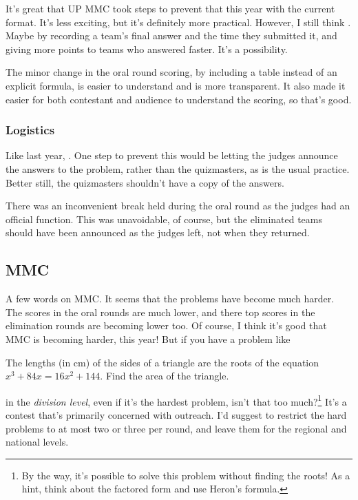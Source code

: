 \documentclass[11pt,paper=letter]{scrartcl}
\begin{document}
It's great that UP MMC took steps to prevent that this year with the current format. It's less exciting, but it's definitely more practical. However, I still think . Maybe by recording a team's final answer and the time they submitted it, and giving more points to teams who answered faster. It's a possibility.

The minor change in the oral round scoring, by including a table instead of an explicit formula, is easier to understand and is more transparent. It also made it easier for both contestant and audience to understand the scoring, so that's good.

\subsubsection*{Logistics}

Like last year, . One step to prevent this would be letting the judges announce the answers to the problem, rather than the quizmasters, as is the usual practice. Better still, the quizmasters shouldn't have a copy of the answers.

There was an inconvenient break held during the oral round as the judges had an official function. This was unavoidable, of course, but the eliminated teams should have been announced as the judges left, not when they returned. 

\subsection{MMC}

A few words on MMC. It seems that the problems have become much harder. The scores in the oral rounds are much lower, and there top scores in the elimination rounds are becoming lower too. Of course, I think it's good that MMC is becoming harder,  this year! But if you have a problem like

\begin{probboxed}
   The lengths (in cm) of the sides of a triangle are the roots of the equation $x^3 + 84x = 16x^2 + 144$. Find the area of the triangle. 
\end{probboxed}

\noindent in the \emph{division level}, even if it's the hardest problem, isn't that too much?\footnote{By the way, it's possible to solve this problem without finding the roots! As a hint, think about the factored form and use Heron's formula.}  It's a contest that's primarily concerned with outreach. I'd suggest to restrict the hard problems to at most two or three per round, and leave them for the regional and national levels.
\end{document}
